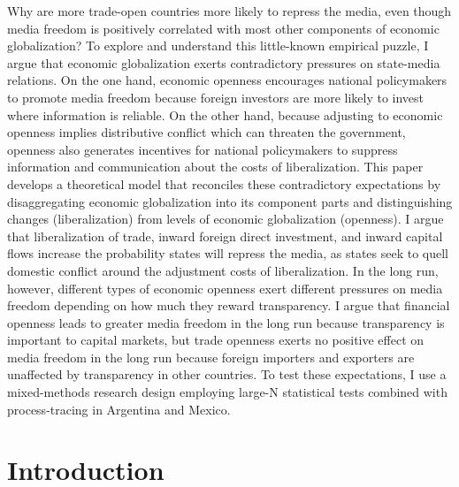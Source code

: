 \documentclass[12pt]{report}
\begin{document}
Why are more trade-open countries more likely to repress the media, even though media freedom is
positively correlated with most other components of economic globalization? To explore and
understand this little-known empirical puzzle, I argue that economic globalization exerts
contradictory pressures on state-media relations. On the one hand, economic openness encourages
national policymakers to promote media freedom because foreign investors are more likely to invest
where information is reliable. On the other hand, because adjusting to economic openness implies
distributive conflict which can threaten the government, openness also generates incentives for
national policymakers to suppress information and communication about the costs of liberalization.
This paper develops a theoretical model that reconciles these contradictory expectations by
disaggregating economic globalization into its component parts and distinguishing changes
(liberalization) from levels of economic globalization (openness). I argue that liberalization of
trade, inward foreign direct investment, and inward capital flows increase the probability states
will repress the media, as states seek to quell domestic conflict around the adjustment costs of
liberalization. In the long run, however, different types of economic openness exert different
pressures on media freedom depending on how much they reward transparency. I argue that financial
openness leads to greater media freedom in the long run because transparency is important to capital
markets, but trade openness exerts no positive effect on media freedom in the long run because
foreign importers and exporters are unaffected by transparency in other countries. To test these
expectations, I use a mixed-methods research design employing large-N statistical tests combined
with process-tracing in Argentina and Mexico.

\section{Introduction}
\end{document}
